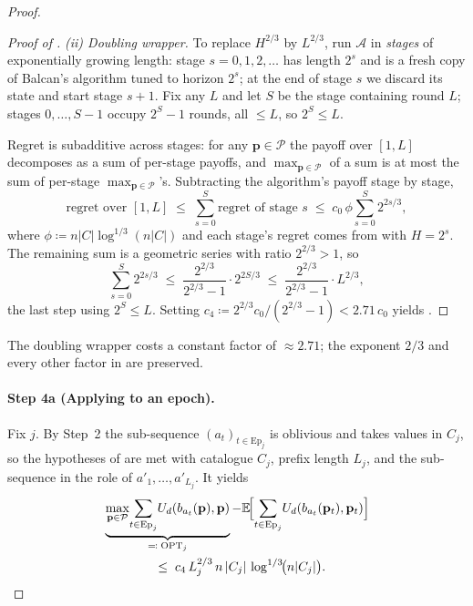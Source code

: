 \documentclass[letterpaper,9pt,twocolumn]{extarticle}
\newcommand{\pvec}{\mathbf{p}}
\newcommand{\cP}{\mathcal{P}}
\newcommand{\EE}{\mathbb{E}}
\newcommand{\Ep}{\mathrm{Ep}}
\theoremstyle{plain}
\theoremstyle{definition}
\theoremstyle{remark}
\begin{document}
\begin{proof}
\begin{proof}[Proof of ]
\emph{(ii) Doubling wrapper.}
To replace $H^{2/3}$ by $L^{2/3}$, run $\mathcal{A}$ in \emph{stages}
of exponentially growing length: stage $s=0,1,2,\dots$ has length
$2^{s}$ and is a fresh copy of Balcan's algorithm tuned to horizon
$2^{s}$; at the end of stage $s$ we discard its state and start stage
$s+1$. Fix any $L$ and let $S$ be the stage containing round $L$;
stages $0,\dots,S-1$ occupy $2^{S}-1$ rounds, all $\le L$, so
$2^{S}\le L$.

Regret is subadditive across stages: for any $\pvec\in\cP$ the payoff
over $[1,L]$ decomposes as a sum of per-stage payoffs, and
$\max_{\pvec\in\cP}$ of a sum is at most the sum of per-stage
$\max_{\pvec\in\cP}$'s. Subtracting the algorithm's payoff stage by
stage,
\[
\text{regret over }[1,L]\;\le\;\sum_{s=0}^{S}\text{regret of stage }s
\;\le\;c_0\,\phi\sum_{s=0}^{S}2^{2s/3},
\]
where $\phi\coloneqq n|C|\log^{1/3}(n|C|)$ and each stage's regret comes
from  with $H=2^{s}$. The remaining sum is a
geometric series with ratio $2^{2/3}>1$, so
\[
\sum_{s=0}^{S}2^{2s/3}\;\le\;\frac{2^{2/3}}{2^{2/3}-1}\cdot 2^{2S/3}
\;\le\;\frac{2^{2/3}}{2^{2/3}-1}\cdot L^{2/3},
\]
the last step using $2^{S}\le L$. Setting
$c_4\coloneqq 2^{2/3}c_0/(2^{2/3}-1)<2.71\,c_0$ yields
.
\end{proof}

The doubling wrapper costs a constant factor of $\approx 2.71$; the
exponent $2/3$ and every other factor in  are
preserved.

\paragraph{Step 4a (Applying  to an epoch).}
Fix $j$. By Step~2 the sub-sequence $(a_t)_{t\in\Ep_j}$ is oblivious and
takes values in $C_j$, so the hypotheses of  are met
with catalogue $C_j$, prefix length $L_j$, and the sub-sequence in the
role of $a'_1,\dots,a'_{L_j}$. It yields
\begin{align}
&\underbrace{\max_{\pvec\in\cP}\!\sum_{t\in\Ep_j}\!U_d(b_{a_t}(\pvec),\pvec)}_{\eqqcolon\;\mathrm{OPT}_j}
 -\EE\!\Bigl[\sum_{t\in\Ep_j}\!U_d(b_{a_t}(\pvec_t),\pvec_t)\Bigr]\notag\\
&\hspace{4em}\le\;c_4\,L_j^{2/3}\,n\,|C_j|\,\log^{1/3}\!\bigl(n|C_j|\bigr).
\label{eq:balcan61-epoch}
\end{align}


\end{proof}
\end{document}
